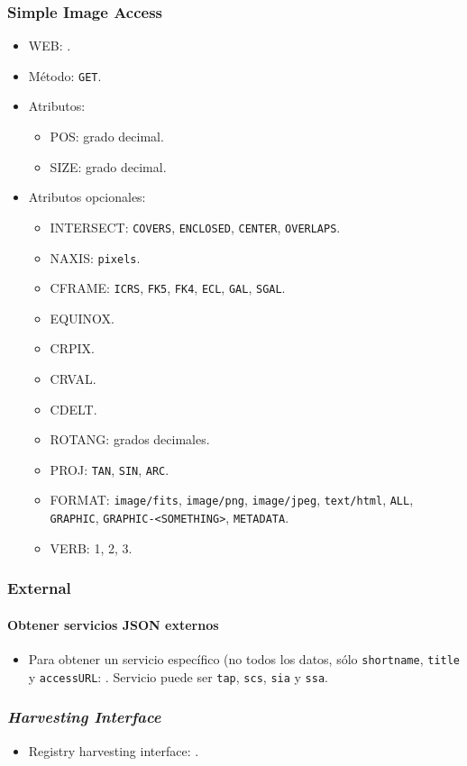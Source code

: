 \subsubsection*{{\sc Simple Image Access}}

\begin{itemize}
	\item WEB: \url{}.
	\item M\'etodo: \verb;GET;.
	\item Atributos: 
		\begin{itemize}
			\item POS: grado decimal.
			\item SIZE: grado decimal.
		\end{itemize}
	\item Atributos opcionales:
		\begin{itemize}
			\item INTERSECT: \verb;COVERS;, \verb;ENCLOSED;, \verb;CENTER;, \verb;OVERLAPS;.
			\item NAXIS: \verb;pixels;.
			\item CFRAME: \verb;ICRS;, \verb;FK5;, \verb;FK4;, \verb;ECL;, \verb;GAL;, \verb;SGAL;.
			\item EQUINOX.
			\item CRPIX.
			\item CRVAL.
			\item CDELT.
			\item ROTANG: grados decimales.
			\item PROJ: \verb;TAN;, \verb;SIN;, \verb;ARC;.
			\item FORMAT: \verb;image/fits;, \verb;image/png;, \verb;image/jpeg;, \verb;text/html;, \verb;ALL;, \verb;GRAPHIC;, \verb;GRAPHIC-<SOMETHING>;, \verb;METADATA;.
			\item VERB: 1, 2, 3.
		\end{itemize}
\end{itemize}

\subsubsection*{{\sc External}} 

\paragraph{Obtener servicios JSON externos}

\begin{itemize}
	\item Para obtener un servicio específico (no todos los datos, sólo \verb;shortname;, \verb;title; y \verb;accessURL;: \url{}. Servicio puede ser \verb;tap;, \verb;scs;, \verb;sia; y \verb;ssa;.
\end{itemize}

\subsubsection*{\emph{Harvesting Interface}}

\begin{itemize}
	\item Registry harvesting interface: \url{}.
\end{itemize}
